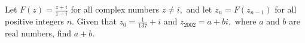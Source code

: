 Let $F(z)=\frac{z+i}{z-i}$ for all complex numbers $z\not= i,$ and let $z_n=F(z_{n-1})$ for all positive integers $n.$  Given that $z_0=\frac 1{137}+i$ and $z_{2002}=a+bi,$ where $a$ and $b$ are real numbers, find $a+b.$